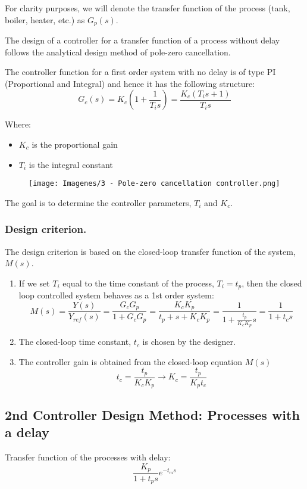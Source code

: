 For clarity purposes, we will denote the transfer function of the process (tank, boiler, heater, etc.) as $G_p(s)$.

The design of a controller for a transfer function of a process without delay follows the analytical design method of pole-zero cancellation.

The controller function for a first order system with no delay is of type PI (Proportional and Integral) and hence it has the following structure:
\[G_c(s) = K_c \left( 1 + \frac{1}{T_i s}\right) = \frac{K_c (T_i s + 1)}{T_i s}\]

Where:
\begin{itemize}
    \item $K_c$ is the proportional gain
    \item $T_i$ is the integral constant
\end{itemize}

\begin{figure}[H]
    \centering
    \texttt{[image: Imagenes/3 - Pole-zero cancellation controller.png]}
\end{figure}

The goal is to determine the controller parameters, $T_i$ and $K_c$.

\subsubsection{Design criterion.}
The design criterion is based on the closed-loop transfer function of the system, $M(s)$.
\begin{enumerate}
    \item If we set $T_i$ equal to the time constant of the process, $T_i = t_p$, then the closed loop controlled system behaves as a 1st order system:
    \[M(s) = \frac{Y(s)}{Y_{ref}(s)} = \frac{G_c G_p}{1 + G_c G_p} = \frac{K_c K_p}{t_p + s + K_c K_p} = \frac{1}{1 + \frac{t_p}{K_c K_p}s} = \frac{1}{1 + t_c s}\]
    \item The closed-loop time constant, $t_c$ is chosen by the designer.
    \item The controller gain is obtained from the closed-loop equation $M(s)$
    \[t_c = \frac{t_p}{K_c K_p} \rightarrow K_c = \frac{t_p}{K_p t_c}\]
\end{enumerate}

\subsection{2nd Controller Design Method: Processes with a delay}
Transfer function of the processes with delay:
\[\frac{K_p}{1 + t_p s} e^{-t_m s}\]

